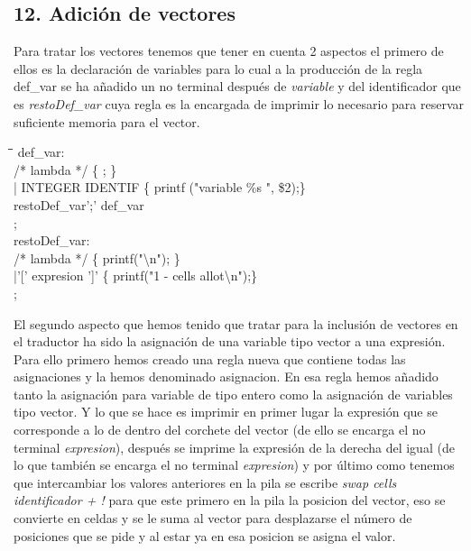 \documentclass[11pt,spanish]{article}
\begin{document}
		\subsection*{12. Adición de vectores}
		\label{subsec:12}
		Para tratar los vectores tenemos que tener en cuenta 2 aspectos el primero de ellos es la declaración de variables para lo cual a la producción de la regla {\ttfamily def\_var} se ha añadido un no terminal después de \textit {variable} y del identificador que es \textit {restoDef\_var} cuya regla es la encargada de imprimir lo necesario para reservar suficiente memoria para el vector.
		\begin{tabbing}
			\hspace*{1cm}\=\hspace*{1cm}\= \hspace*{4cm}\=\kill
			def\_var:   \\		   
				\> /* lambda */\> \>		\{ ; \}\\
				 \>| INTEGER IDENTIF\> \> \{ printf ("variable \%s ", \$2);\} \\
				 \>\>restoDef\_var';' def\_var\\
			 ;\\
			 
			restoDef\_var:\\
					\> /* lambda */ \> \>		\{ printf("\textbackslash n"); \} \\
					\>|'[' expresion ']'\> \>	\{ printf("1 - cells allot\textbackslash n");\} \\
			;
			
		\end{tabbing}
		El segundo aspecto que hemos tenido que tratar para la inclusión de vectores en el traductor ha sido la asignación de una variable tipo vector a una expresión. Para ello primero hemos creado una regla nueva que contiene todas las asignaciones y la hemos denominado {\ttfamily asignacion}. En esa regla hemos añadido tanto la asignación para variable de tipo entero como la asignación de variables tipo vector. Y lo que se hace es imprimir en primer lugar la expresión que se corresponde a lo de dentro del corchete del vector (de ello se encarga el no terminal \textit {expresion}), después se imprime la expresión de la derecha del igual (de lo que también se encarga el no terminal \textit {expresion}) y por último como tenemos que intercambiar los valores anteriores en la pila se escribe \textit{swap cells identificador + !} para que este primero en la pila la posicion del vector, eso se convierte en celdas y se le suma al vector para desplazarse el número de posiciones que se pide y al estar ya en esa posicion se asigna el valor.
\end{document}
